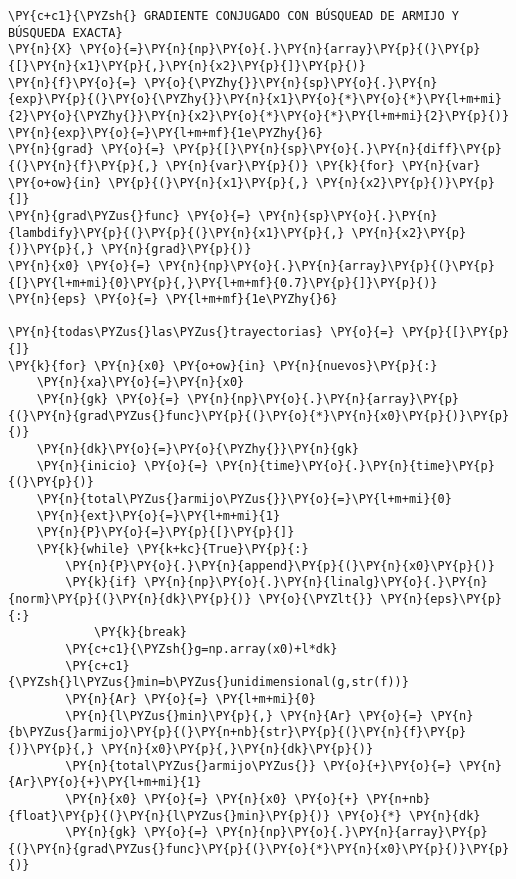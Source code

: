 \begin{itemize}
    \begin{tcolorbox}[breakable, size=fbox, boxrule=1pt, pad at break*=1mm,colback=cellbackground, colframe=cellborder]
\begin{Verbatim}[commandchars=\\\{\}]
\PY{c+c1}{\PYZsh{} GRADIENTE CONJUGADO CON BÚSQUEAD DE ARMIJO Y BÚSQUEDA EXACTA}
\PY{n}{X} \PY{o}{=}\PY{n}{np}\PY{o}{.}\PY{n}{array}\PY{p}{(}\PY{p}{[}\PY{n}{x1}\PY{p}{,}\PY{n}{x2}\PY{p}{]}\PY{p}{)}
\PY{n}{f}\PY{o}{=} \PY{o}{\PYZhy{}}\PY{n}{sp}\PY{o}{.}\PY{n}{exp}\PY{p}{(}\PY{o}{\PYZhy{}}\PY{n}{x1}\PY{o}{*}\PY{o}{*}\PY{l+m+mi}{2}\PY{o}{\PYZhy{}}\PY{n}{x2}\PY{o}{*}\PY{o}{*}\PY{l+m+mi}{2}\PY{p}{)}
\PY{n}{exp}\PY{o}{=}\PY{l+m+mf}{1e\PYZhy{}6}
\PY{n}{grad} \PY{o}{=} \PY{p}{[}\PY{n}{sp}\PY{o}{.}\PY{n}{diff}\PY{p}{(}\PY{n}{f}\PY{p}{,} \PY{n}{var}\PY{p}{)} \PY{k}{for} \PY{n}{var} \PY{o+ow}{in} \PY{p}{(}\PY{n}{x1}\PY{p}{,} \PY{n}{x2}\PY{p}{)}\PY{p}{]}
\PY{n}{grad\PYZus{}func} \PY{o}{=} \PY{n}{sp}\PY{o}{.}\PY{n}{lambdify}\PY{p}{(}\PY{p}{(}\PY{n}{x1}\PY{p}{,} \PY{n}{x2}\PY{p}{)}\PY{p}{,} \PY{n}{grad}\PY{p}{)}
\PY{n}{x0} \PY{o}{=} \PY{n}{np}\PY{o}{.}\PY{n}{array}\PY{p}{(}\PY{p}{[}\PY{l+m+mi}{0}\PY{p}{,}\PY{l+m+mf}{0.7}\PY{p}{]}\PY{p}{)}
\PY{n}{eps} \PY{o}{=} \PY{l+m+mf}{1e\PYZhy{}6}

\PY{n}{todas\PYZus{}las\PYZus{}trayectorias} \PY{o}{=} \PY{p}{[}\PY{p}{]}
\PY{k}{for} \PY{n}{x0} \PY{o+ow}{in} \PY{n}{nuevos}\PY{p}{:}
    \PY{n}{xa}\PY{o}{=}\PY{n}{x0}
    \PY{n}{gk} \PY{o}{=} \PY{n}{np}\PY{o}{.}\PY{n}{array}\PY{p}{(}\PY{n}{grad\PYZus{}func}\PY{p}{(}\PY{o}{*}\PY{n}{x0}\PY{p}{)}\PY{p}{)}
    \PY{n}{dk}\PY{o}{=}\PY{o}{\PYZhy{}}\PY{n}{gk}
    \PY{n}{inicio} \PY{o}{=} \PY{n}{time}\PY{o}{.}\PY{n}{time}\PY{p}{(}\PY{p}{)}
    \PY{n}{total\PYZus{}armijo\PYZus{}}\PY{o}{=}\PY{l+m+mi}{0}
    \PY{n}{ext}\PY{o}{=}\PY{l+m+mi}{1}
    \PY{n}{P}\PY{o}{=}\PY{p}{[}\PY{p}{]}
    \PY{k}{while} \PY{k+kc}{True}\PY{p}{:}
        \PY{n}{P}\PY{o}{.}\PY{n}{append}\PY{p}{(}\PY{n}{x0}\PY{p}{)}  
        \PY{k}{if} \PY{n}{np}\PY{o}{.}\PY{n}{linalg}\PY{o}{.}\PY{n}{norm}\PY{p}{(}\PY{n}{dk}\PY{p}{)} \PY{o}{\PYZlt{}} \PY{n}{eps}\PY{p}{:}
            \PY{k}{break}
        \PY{c+c1}{\PYZsh{}g=np.array(x0)+l*dk}
        \PY{c+c1}{\PYZsh{}l\PYZus{}min=b\PYZus{}unidimensional(g,str(f))}
        \PY{n}{Ar} \PY{o}{=} \PY{l+m+mi}{0}
        \PY{n}{l\PYZus{}min}\PY{p}{,} \PY{n}{Ar} \PY{o}{=} \PY{n}{b\PYZus{}armijo}\PY{p}{(}\PY{n+nb}{str}\PY{p}{(}\PY{n}{f}\PY{p}{)}\PY{p}{,} \PY{n}{x0}\PY{p}{,}\PY{n}{dk}\PY{p}{)}
        \PY{n}{total\PYZus{}armijo\PYZus{}} \PY{o}{+}\PY{o}{=} \PY{n}{Ar}\PY{o}{+}\PY{l+m+mi}{1}
        \PY{n}{x0} \PY{o}{=} \PY{n}{x0} \PY{o}{+} \PY{n+nb}{float}\PY{p}{(}\PY{n}{l\PYZus{}min}\PY{p}{)} \PY{o}{*} \PY{n}{dk}
        \PY{n}{gk} \PY{o}{=} \PY{n}{np}\PY{o}{.}\PY{n}{array}\PY{p}{(}\PY{n}{grad\PYZus{}func}\PY{p}{(}\PY{o}{*}\PY{n}{x0}\PY{p}{)}\PY{p}{)}
        

\end{Verbatim}
\end{tcolorbox}
\end{itemize}
